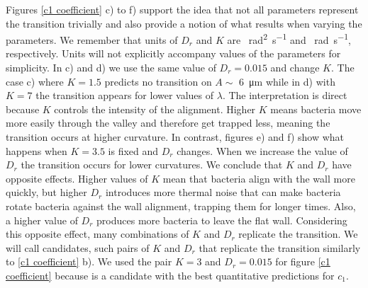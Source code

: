 Figures \ref{c1 coefficient} c) to f) support the idea that not all parameters represent the transition trivially and also provide a notion of what results when varying the parameters. We remember that units of $D_r$ and $K$ are \SI[per-mode = symbol]{}{\square\radian\per\second} and \SI[per-mode = symbol]{}{\radian\per\second}, respectively. Units will not explicitly accompany values of the parameters for simplicity. In c) and d) we use the same value of $D_r =0.015$ and change $K$. The case c) where $K=1.5$ predicts no transition on $A\sim$ \SI{6}{\micro \meter} while in d) with $K=7$ the transition appears for lower values of $\lambda$. The interpretation is direct because $K$ controls the intensity of the alignment. Higher $K$ means bacteria move more easily through the valley and therefore get trapped less, meaning the transition occurs at higher curvature. In contrast, figures e) and f) show what happens when $K=3.5$ is fixed and $D_r$ changes. When we increase the value of $D_r$ the transition occurs for lower curvatures. We conclude that $K$ and $D_r$ have opposite effects. Higher values of $K$ mean that bacteria align with the wall more quickly, but higher $D_r$ introduces more thermal noise that can make bacteria rotate bacteria against the wall alignment, trapping them for longer times. Also, a higher value of $D_r$ produces more bacteria to leave the flat wall. Considering this opposite effect, many combinations of $K$ and $D_r$ replicate the transition. We will call candidates, such pairs of $K$ and $D_r$ that replicate the transition similarly to \ref{c1 coefficient} b). We used the pair $K=3$ and $D_r=0.015$ for figure \ref{c1 coefficient} because is a candidate with the best quantitative predictions for $c_1$.


